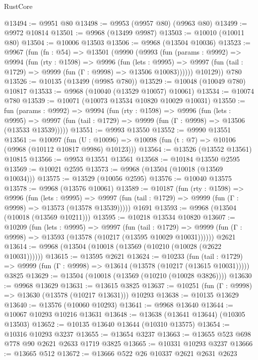 \begin{lexlean}{RustCore}
\begin{coremodule}
@13494 := @9951 @80
@13498 := @9953 (@9957 @80) (@9963 @80)
@13499 := @9972 @10814
@13501 := @9968 (@13499 @9987)
@13503 := @10010 (@10011 @80)
@13504 := @10006 @13503
@13506 := @9968 (@13504 @10036)
@13523 := @9967
    (fun (fn : @54) =>
    @13501
      (@9990
        (@9993
          (fun (params : @9992) =>
          @9994
            (fun (rty : @1598) =>
            @9996
              (fun (lets : @9995) =>
              @9997 (fun (tail : @1729) => @9999 (fun (Γ : @9998) => @13506 @10083))))))
        @10129))
    @780
@13526 := @10135 (@13499 (@9985 @780))
@13529 := @10048 (@10049 @780) @10817
@13533 := @9968 (@10040 (@13529 @10057) @10061)
@13534 := @10074 @780
@13539 := @10071 (@10073 @13534 @10820 @10029 @10031)
@13550 := fun (params : @9992) =>
  @9994
    (fun (rty : @1598) =>
    @9996
      (fun (lets : @9995) =>
      @9997 (fun (tail : @1729) => @9999 (fun (Γ : @9998) => @13506 (@13533 @13539)))))
@13551 := @9993 @13550
@13552 := @9990 @13551
@13561 := @10097
    (fun (U : @10096) => @10098 (fun (t : @7) => @10106 (@9968 (@10112 @10817 @9986) @10123)))
@13564 := @13526 (@13552 @13561) @10815
@13566 := @9953 @13551 @13561
@13568 := @10184 @13550 @2595
@13569 := @10021 @2595
@13573 := @9968 (@13504 (@10018 (@13569 @10034)))
@13575 := @13529 (@10056 @2595)
@13576 := @10040 @13575
@13578 := @9968 (@13576 @10061)
@13589 := @10187
    (fun (rty : @1598) =>
    @9996
      (fun (lets : @9995) =>
      @9997 (fun (tail : @1729) => @9999 (fun (Γ : @9998) => @13573 (@13578 @13539)))))
    @1691
@13593 := @9968 (@13504 (@10018 (@13569 @10211)))
@13595 := @10218 @13534 @10820
@13607 := @10209
    (fun (lets : @9995) =>
    @9997
      (fun (tail : @1729) =>
      @9999 (fun (Γ : @9998) => @13593 (@13578 (@10217 (@13595 @10029 @10031))))))
    @2621
@13614 := @9968 (@13504 (@10018 (@13569 (@10210 (@10028 (@2622 @10031))))))
@13615 := @13595 @2621
@13624 := @10233
    (fun (tail : @1729) => @9999 (fun (Γ : @9998) => @13614 (@13578 (@10217 (@13615 @10031)))))
    @3825
@13629 := @13504 (@10018 (@13569 (@10210 (@10028 @3826))))
@13630 := @9968 @13629
@13631 := @13615 @3825
@13637 := @10251 (fun (Γ : @9998) => @13630 (@13578 (@10217 @13631))) @10293
@13638 := @10135 @13629
@13640 := @13576 (@10060 @10293)
@13641 := @9968 @13640
@13644 := @10067 @10293 @10216 @13631
@13648 := @13638 (@13641 @13644) (@10305 @13503)
@13652 := @10135 @13640 @13644 (@10310 @13575)
@13654 := @10316 @10293 @3237
@13655 := @13654 @3237
@13663 := @13655 @523 @698 @778 @90 @2621 @2633 @1719 @3825
@13665 := @10331 @10293 @3237
@13666 := @13665 @512
@13672 := @13666 @522 @26 @10337 @2621 @2631 @2623

\end{coremodule}
\end{lexlean}
